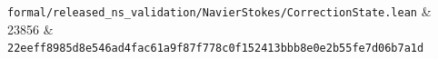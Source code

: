\documentclass[10pt,a4paper]{article}
\begin{document}
{\begin{longtable}[]
\texttt{f\allowbreak{}o\allowbreak{}r\allowbreak{}m\allowbreak{}a\allowbreak{}l\allowbreak{}/\allowbreak{}r\allowbreak{}e\allowbreak{}l\allowbreak{}e\allowbreak{}a\allowbreak{}s\allowbreak{}e\allowbreak{}d\allowbreak{}\_\allowbreak{}n\allowbreak{}s\allowbreak{}\_\allowbreak{}v\allowbreak{}a\allowbreak{}l\allowbreak{}i\allowbreak{}d\allowbreak{}a\allowbreak{}t\allowbreak{}i\allowbreak{}o\allowbreak{}n\allowbreak{}/\allowbreak{}N\allowbreak{}a\allowbreak{}v\allowbreak{}i\allowbreak{}e\allowbreak{}r\allowbreak{}S\allowbreak{}t\allowbreak{}o\allowbreak{}k\allowbreak{}e\allowbreak{}s\allowbreak{}/\allowbreak{}C\allowbreak{}o\allowbreak{}r\allowbreak{}r\allowbreak{}e\allowbreak{}c\allowbreak{}t\allowbreak{}i\allowbreak{}o\allowbreak{}n\allowbreak{}S\allowbreak{}t\allowbreak{}a\allowbreak{}t\allowbreak{}e\allowbreak{}.\allowbreak{}l\allowbreak{}e\allowbreak{}a\allowbreak{}n} & {}23856 & \texttt{2\allowbreak{}2\allowbreak{}e\allowbreak{}e\allowbreak{}f\allowbreak{}f\allowbreak{}8\allowbreak{}9\allowbreak{}8\allowbreak{}5\allowbreak{}d\allowbreak{}8\allowbreak{}e\allowbreak{}5\allowbreak{}4\allowbreak{}6\allowbreak{}a\allowbreak{}d\allowbreak{}4\allowbreak{}f\allowbreak{}a\allowbreak{}c\allowbreak{}6\allowbreak{}1\allowbreak{}a\allowbreak{}9\allowbreak{}f\allowbreak{}8\allowbreak{}7\allowbreak{}f\allowbreak{}7\allowbreak{}7\allowbreak{}8\allowbreak{}c\allowbreak{}0\allowbreak{}f\allowbreak{}1\allowbreak{}5\allowbreak{}2\allowbreak{}4\allowbreak{}1\allowbreak{}3\allowbreak{}b\allowbreak{}b\allowbreak{}b\allowbreak{}8\allowbreak{}e\allowbreak{}0\allowbreak{}e\allowbreak{}2\allowbreak{}b\allowbreak{}5\allowbreak{}5\allowbreak{}f\allowbreak{}e\allowbreak{}7\allowbreak{}d\allowbreak{}0\allowbreak{}6\allowbreak{}b\allowbreak{}7\allowbreak{}a\allowbreak{}1\allowbreak{}d} \\

\end{longtable}}
\end{document}

